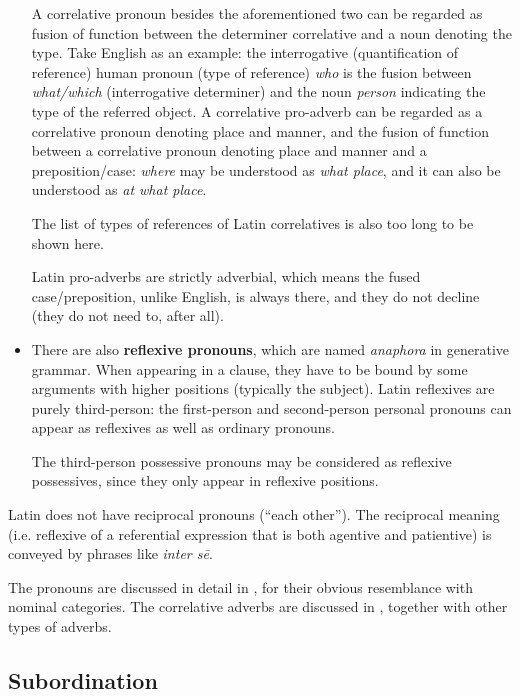 \documentclass{article}
\newcommand*{\concept}[1]{\textbf{#1}}
\newcommand*{\term}[1]{\emph{#1}}
\newcommand*{\corpus}[1]{\emph{#1}}
\begin{document}
\begin{itemize}
    A correlative pronoun besides the aforementioned two 
    can be regarded as fusion of function between the determiner correlative 
    and a noun denoting the type.
    Take English as an example:
    the interrogative (quantification of reference) human pronoun (type of reference) \corpus{who}
    is the fusion between \corpus{what/which} (interrogative determiner) 
    and the noun \corpus{person} indicating the type of the referred object.
    A correlative pro-adverb can be regarded as a correlative pronoun denoting place and manner,
    and the fusion of function between a correlative pronoun denoting place and manner and a preposition/case:
    \corpus{where} may be understood as \corpus{what place}, and it can also be understood as \corpus{at what place}.
    
    The list of types of references of Latin correlatives is also too long to be shown here.
    
    Latin pro-adverbs are strictly adverbial, 
    which means the fused case/preposition, unlike English, is always there,
    and they do not decline (they do not need to, after all).
    \item There are also \concept{reflexive pronouns},
    which are named \term{anaphora} in generative grammar. 
    When appearing in a clause, they have to be bound by some arguments with higher positions 
    (typically the subject).
    Latin reflexives are purely third-person: 
    the first-person and second-person personal pronouns can appear as reflexives as well as ordinary pronouns.

    The third-person possessive pronouns may be considered as reflexive possessives,
    since they only appear in reflexive positions.
\end{itemize}

Latin does not have reciprocal pronouns (``each other'').
The reciprocal meaning (i.e. reflexive of a referential expression that is both agentive and patientive)
is conveyed by phrases like \corpus{inter s\={e}}. 

The pronouns are discussed in detail in ,
for their obvious resemblance with nominal categories.
The correlative adverbs are discussed in ,
together with other types of adverbs.

\subsection{Subordination}\label{sec:subordination-abs}
\end{document}
